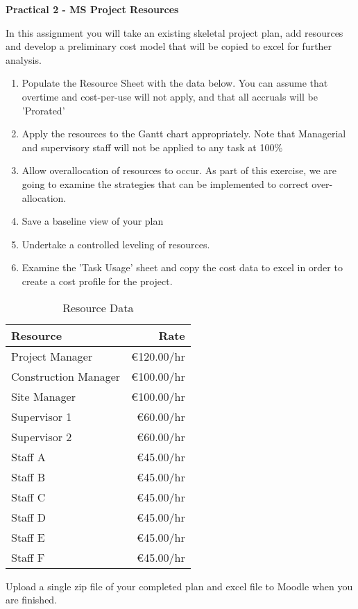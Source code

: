 

\begin{flushleft}
\Large\textbf{Practical 2 - MS Project Resources}\\
\end{flushleft}



In this assignment you will take an existing skeletal project plan, add resources and develop a preliminary cost model that will be copied to excel for further analysis.
\begin{enumerate}
	\item Populate the Resource Sheet with the data below.  You can assume that overtime and cost-per-use will not apply, and that all accruals will be 'Prorated'
	\item Apply the resources to the Gantt chart appropriately. Note that Managerial and supervisory staff will not be applied to any task at 100\% 
	\item Allow overallocation of resources to occur. As part of this exercise, we are going to examine the strategies that can be implemented to correct over-allocation.  
	\item Save a baseline view of your plan
	\item Undertake a controlled leveling of resources.
	\item Examine the 'Task Usage' sheet and copy the cost data to excel in order to create a cost profile for the project.
\end{enumerate}


\begin{table}[h]
	\centering
		\begin{tabular}{| l | r |} \hline
			\textbf{Resource}	& \textbf{Rate} \\
			\hline
			Project Manager				&	€120.00/hr	\\
			Construction Manager	&	€100.00/hr	\\
			Site Manager					&	€100.00/hr	\\
			Supervisor 1					&	€60.00/hr	\\
			Supervisor 2					&	€60.00/hr	\\
			Staff A								&	€45.00/hr	\\
			Staff B								&	€45.00/hr	\\
			Staff C								&	€45.00/hr	\\
			Staff D								&	€45.00/hr	\\
			Staff E								&	€45.00/hr	\\
			Staff F								&	€45.00/hr	\\
			\hline
		\end{tabular}
	\caption{Resource Data}
	\label{tab:ResourceData}
\end{table}


Upload a single zip file of your completed plan and excel file to Moodle when you are finished.

